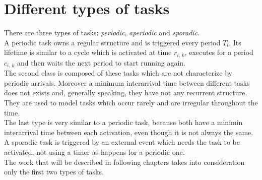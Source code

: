\section{Different types of tasks}
There are three types of tasks: \emph{periodic}, \emph{aperiodic} and \emph{sporadic}.\\
A periodic task owns a regular structure and is triggered every period \( T_{i} \). Its lifetime is similar to a cycle which is activated at time \( r_{i,\,k} \), executes for a period \( c_{i,\,k} \) and then waits the next period to start running again.\\
The second class is composed of these tasks which are not characterize by periodic arrivals. Moreover a minimum interarrival time between different tasks does not exists and, generally speaking, they have not any recurrent structure. They are used to model tasks which occur rarely and are irregular throughout the time.\\
The last type is very similar to a periodic task, because both have a minimin interarrival time between each activation, even though it is not always the same. A sporadic task is triggered by an external event which needs the task to be activated, not using a timer as happens for a periodic one.\\
The work that will be described in following chapters takes into consideration only the first two types of tasks.

